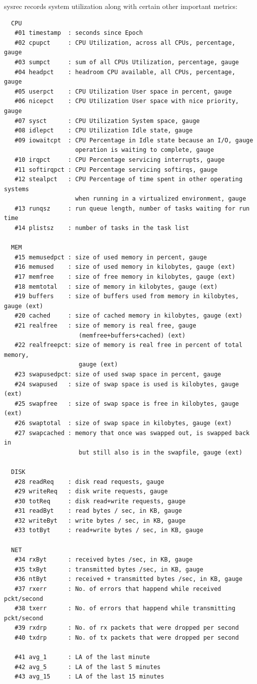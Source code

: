 \noindent
sysrec records system utilization along with certain other important metrics:
\begin{verbatim}
  CPU
   #01 timestamp  : seconds since Epoch
   #02 cpupct     : CPU Utilization, across all CPUs, percentage, gauge
   #03 sumpct     : sum of all CPUs Utilization, percentage, gauge
   #04 headpct    : headroom CPU available, all CPUs, percentage, gauge
   #05 userpct    : CPU Utilization User space in percent, gauge
   #06 nicepct    : CPU Utilization User space with nice priority, gauge
   #07 sysct      : CPU Utilization System space, gauge
   #08 idlepct    : CPU Utilization Idle state, gauge
   #09 iowaitcpt  : CPU Percentage in Idle state because an I/O, gauge
                    operation is waiting to complete, gauge
   #10 irqpct     : CPU Percentage servicing interrupts, gauge
   #11 softirqpct : CPU Percentage servicing softirqs, gauge
   #12 stealpct   : CPU Percentage of time spent in other operating systems
                    when running in a virtualized environment, gauge
   #13 runqsz     : run queue length, number of tasks waiting for run time
   #14 plistsz    : number of tasks in the task list

  MEM
   #15 memusedpct : size of used memory in percent, gauge
   #16 memused    : size of used memory in kilobytes, gauge (ext)
   #17 memfree    : size of free memory in kilobytes, gauge (ext)
   #18 memtotal   : size of memory in kilobytes, gauge (ext)
   #19 buffers    : size of buffers used from memory in kilobytes, gauge (ext)
   #20 cached     : size of cached memory in kilobytes, gauge (ext)
   #21 realfree   : size of memory is real free, gauge 
                     (memfree+buffers+cached) (ext)
   #22 realfreepct: size of memory is real free in percent of total memory,
                     gauge (ext)
   #23 swapusedpct: size of used swap space in percent, gauge
   #24 swapused   : size of swap space is used is kilobytes, gauge (ext)
   #25 swapfree   : size of swap space is free in kilobytes, gauge (ext)
   #26 swaptotal  : size of swap space in kilobytes, gauge (ext)
   #27 swapcached : memory that once was swapped out, is swapped back in 
                     but still also is in the swapfile, gauge (ext)

  DISK
   #28 readReq    : disk read requests, gauge
   #29 writeReq   : disk write requests, gauge
   #30 totReq     : disk read+write requests, gauge
   #31 readByt    : read bytes / sec, in KB, gauge
   #32 writeByt   : write bytes / sec, in KB, gauge
   #33 totByt     : read+write bytes / sec, in KB, gauge

  NET
   #34 rxByt      : received bytes /sec, in KB, gauge
   #35 txByt      : transmitted bytes /sec, in KB, gauge
   #36 ntByt      : received + transmitted bytes /sec, in KB, gauge
   #37 rxerr      : No. of errors that happend while received pckt/second
   #38 txerr      : No. of errors that happend while transmitting pckt/second
   #39 rxdrp      : No. of rx packets that were dropped per second
   #40 txdrp      : No. of tx packets that were dropped per second
 
   #41 avg_1      : LA of the last minute
   #42 avg_5      : LA of the last 5 minutes
   #43 avg_15     : LA of the last 15 minutes
\end{verbatim}


